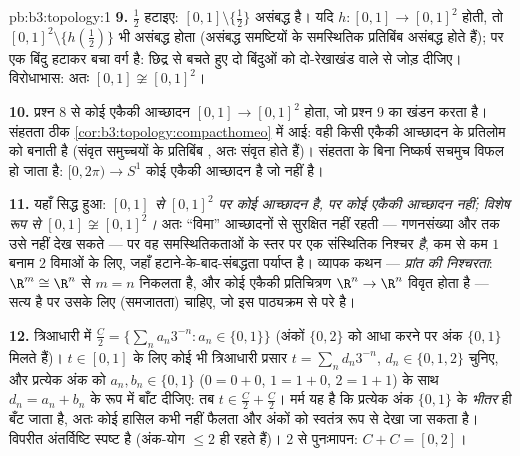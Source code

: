 \begin{solution}{pb:b3:topology:1}
\textbf{9.} $\frac12$ हटाइए: $[0,1]\setminus\{\frac12\}$ असंबद्ध है। यदि $h \colon [0,1] \to [0,1]^2$ 
होती, तो $[0,1]^2\setminus\{h(\frac12)\}$ भी असंबद्ध होता (असंबद्ध समष्टियों के समस्थितिक
प्रतिबिंब असंबद्ध होते हैं); पर एक बिंदु हटाकर बचा वर्ग 
है: छिद्र से बचते हुए दो बिंदुओं को दो-रेखाखंड वाले  से जोड़ दीजिए।
विरोधाभास: अतः $[0,1] \not\cong [0,1]^2$।

\textbf{10.} प्रश्न 8 से कोई एकैकी  आच्छादन $[0,1] \to [0,1]^2$ 
होता, जो प्रश्न 9 का खंडन करता है। संहतता ठीक \cref{cor:b3:topology:compacthomeo} में आई: वही
किसी  एकैकी आच्छादन के प्रतिलोम को  बनाती है (संवृत समुच्चयों
के प्रतिबिंब , अतः संवृत होते हैं)। संहतता के बिना निष्कर्ष सचमुच
विफल हो जाता है: $[0, 2\pi) \to S^1$ कोई  एकैकी आच्छादन है जो  नहीं
है।

\textbf{11.} यहाँ सिद्ध हुआ: \emph{$[0,1]$ से $[0,1]^2$ पर कोई  आच्छादन
है, पर कोई  एकैकी आच्छादन नहीं; विशेष रूप से $[0,1] \not\cong [0,1]^2$।} अतः
``विमा''  आच्छादनों से सुरक्षित नहीं रहती --- गणनसंख्या और
 तक उसे नहीं देख सकते --- पर वह समस्थितिकताओं के स्तर पर एक
संस्थितिक निश्चर \emph{है}, कम से कम $1$ बनाम $2$ विमाओं के लिए,
जहाँ हटाने-के-बाद-संबद्धता पर्याप्त है। व्यापक कथन --- \emph{प्रांत
की निश्चरता}: $\R^m \cong \R^n$ से $m =
n$ निकलता है, और कोई  एकैकी प्रतिचित्रण
$\R^n \to \R^n$ विवृत होता है --- सत्य है पर उसके लिए   (समजातता)
चाहिए, जो इस पाठ्यक्रम से परे है।

\textbf{12.} त्रिआधारी में $\frac C2 = \{\sum_na_n3^{-n} : a_n
\in \{0, 1\}\}$ (अंकों $\{0,2\}$ को आधा करने पर अंक
$\{0,1\}$ मिलते हैं)। $t \in [0,1]$ के लिए कोई भी त्रिआधारी प्रसार $t =
\sum_nd_n3^{-n}$, $d_n \in \{0,1,2\}$
चुनिए, और प्रत्येक अंक को $a_n, b_n \in \{0,1\}$ ($0 = 0{+}0$, $1 = 1{+}0$, $2 = 1{+}1$) के साथ $d_n = a_n + b_n$
के रूप में बाँट दीजिए: तब $t \in \frac C2 + \frac C2$। मर्म यह है कि प्रत्येक अंक $\{0,1\}$
के \emph{भीतर} ही बँट जाता है, अतः कोई हासिल कभी नहीं फैलता और अंकों
को स्वतंत्र रूप से देखा जा सकता है। विपरीत अंतर्विष्टि स्पष्ट है
(अंक-योग $\leq 2$ ही रहते हैं)। $2$ से पुनःमापन: $C + C = [0,2]$।


\end{solution}
